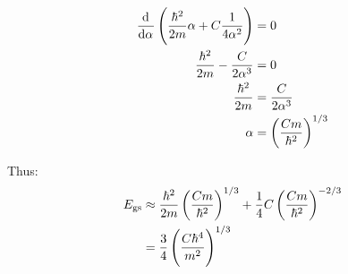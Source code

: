 \begin{align*}
    \dod{}{\alpha} \del{\frac{\hbar^2}{2m} \alpha + C \frac{1}{4 \alpha^2}} & = 0\\
    \frac{\hbar^2}{2m} - \frac{C}{2 \alpha^3} & = 0\\
    \frac{\hbar^2}{2m} & = \frac{C}{2 \alpha^3}\\
    \alpha & = \del{\frac{Cm}{\hbar^2}}^{1/3}
\end{align*}

Thus:
\begin{align*}
    E_{\textrm{gs}} & \approx \frac{\hbar^2}{2m} \del{\frac{Cm}{\hbar^2}}^{1/3} + \frac{1}{4} C \del{\frac{Cm}{\hbar^2}}^{-2/3}\\
    & = \frac{3}{4} \del{\frac{C \hbar^4}{m^2}}^{1/3}
\end{align*}

\subsection{}
